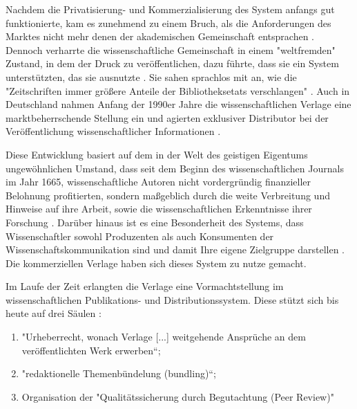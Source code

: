 Nachdem die Privatisierung- und Kommerzialisierung des System anfangs gut funktionierte, kam es zunehmend zu einem Bruch, als die Anforderungen des Marktes nicht mehr denen der akademischen Gemeinschaft entsprachen \cite{epaa_Weiner_2001}. Dennoch verharrte die wissenschaftliche Gemeinschaft in einem "weltfremden" Zustand, in dem der Druck zu veröffentlichen, dazu führte, dass sie ein System unterstützten, das sie ausnutzte \cite{epaa_Weiner_2001}. Sie sahen sprachlos mit an, wie die "Zeitschriften immer größere Anteile der Bibliotheksetats verschlangen" \cite{hagner_2015_sache_buches}. Auch in Deutschland nahmen Anfang der 1990er Jahre die wissenschaftlichen Verlage eine marktbeherrschende Stellung ein und agierten exklusiver Distributor bei der Veröffentlichung wissenschaftlicher Informationen \cite{schloegl_2005} \cite{offhaus_2012_institutionelle_repos}.

Diese Entwicklung basiert auf dem in der Welt des geistigen Eigentums ungewöhnlichen Umstand, dass seit dem Beginn des wissenschaftlichen Journals im Jahr 1665, wissenschaftliche Autoren nicht vordergründig finanzieller Belohnung profitierten, sondern maßgeblich durch die weite Verbreitung und Hinweise auf ihre Arbeit, sowie die wissenschaftlichen Erkenntnisse ihrer Forschung \cite{albert_2006_open_implications}. Darüber hinaus ist es eine Besonderheit des Systems, dass Wissenschaftler sowohl Produzenten als auch Konsumenten der Wissenschaftskommunikation sind und damit Ihre eigene Zielgruppe darstellen \cite{Hess_2006}. Die kommerziellen Verlage haben sich dieses System zu nutze gemacht.

Im Laufe der Zeit erlangten die Verlage eine Vormachtstellung im wissenschaftlichen Publikations- und Distributionssystem. Diese stützt sich bis heute auf drei Säulen \cite{offhaus_2012_institutionelle_repos} \cite{bargheer_2006_open}:
\begin{enumerate}
\item "Urheberrecht, wonach Verlage [...] weitgehende Ansprüche an dem veröffentlichten Werk erwerben“;
\item "redaktionelle Themenbündelung (bundling)“;
\item Organisation der "Qualitätssicherung durch Begutachtung (Peer Review)"
\end{enumerate}

